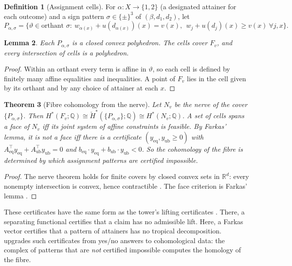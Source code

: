 \documentclass[11pt]{article}
\newtheorem{theorem}{Theorem}[section]
\newtheorem{lemma}[theorem]{Lemma}
\theoremstyle{definition}
\newtheorem{definition}[theorem]{Definition}
\newcommand{\R}{\mathbb R}
\begin{document}
\begin{definition}[Assignment cells]
For $\alpha\colon X\to\{1,2\}$ (a designated attainer for each outcome) and a sign pattern $\sigma\in\{\pm\}^3$ of $(\beta,d_1,d_2)$, let
\[
P_{\alpha,\sigma}=\big\{\vartheta\in\text{orthant }\sigma:\ w_{\alpha(x)}+u(d_{\alpha(x)})(x)=v(x),\ \ w_j+u(d_j)(x)\ge v(x)\ \forall j,x\big\}.
\]
\end{definition}

\begin{lemma}
Each $P_{\alpha,\sigma}$ is a closed convex polyhedron. The cells cover $F_v$, and every intersection of cells is a polyhedron.
\end{lemma}
\begin{proof}
Within an orthant every term is affine in $\vartheta$, so each cell is defined by finitely many affine equalities and inequalities. A
point of $F_v$ lies in the cell given by its orthant and by any choice of attainer at each $x$.
\end{proof}

\begin{theorem}[Fibre cohomology from the nerve]\label{thm:nerve}
Let $N_v$ be the nerve of the cover $\{P_{\alpha,\sigma}\}$. Then $H^\ast(F_v;\mathbb Q)\cong\check H^\ast(\{P_{\alpha,\sigma}\};\mathbb Q)\cong
H^\ast(N_v;\mathbb Q)$. A set of cells spans a face of $N_v$ iff its joint system of affine constraints is feasible. By Farkas' lemma,
it is \emph{not} a face iff there is a certificate $(y_{\mathrm{eq}},y_{\mathrm{ub}}\ge0)$ with
$A_{\mathrm{eq}}^\top y_{\mathrm{eq}}+A_{\mathrm{ub}}^\top y_{\mathrm{ub}}=0$ and $b_{\mathrm{eq}}\cdot y_{\mathrm{eq}}+b_{\mathrm{ub}}\cdot y_{\mathrm{ub}}<0$.
So the cohomology of the fibre is determined by which assignment patterns are certified impossible.
\end{theorem}
\begin{proof}
The nerve theorem holds for finite covers by closed convex sets in $\R^d$: every nonempty intersection is convex, hence
contractible \cite{Bjorner1995}. The face criterion is Farkas' lemma \cite{Schrijver1986}.
\end{proof}

These certificates have the same form as the tower's lifting certificates \cite[Thm.~10.8, Thm.~10.13(iii)]{Tower}. There, a
separating functional certifies that a claim has no admissible lift. Here, a Farkas vector certifies that a pattern of attainers has no
tropical decomposition.  upgrades such certificates from yes/no answers to cohomological data: the complex of
patterns that are \emph{not} certified impossible computes the homology of the fibre.
\end{document}
